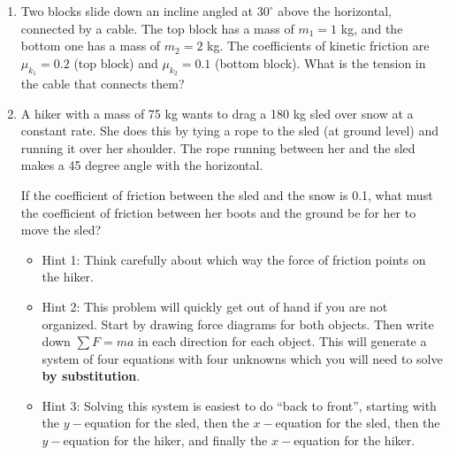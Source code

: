 \documentclass[12pt]{article}
\begin{document}
\begin{enumerate}
\bigskip

\item{Two blocks slide down an incline angled at $30^\circ$ above the horizontal, connected by a cable. The top block has a mass of $m_1=1$ kg, and the bottom one has a mass of $m_2=2$ kg. The coefficients of kinetic friction are 
  $\mu_{k_1}=0.2$ (top block) and $\mu_{k_2}=0.1$ (bottom block). What is the tension in the cable that connects them?}


\bigskip

\item{A hiker with a mass of 75 kg wants to drag a 180 kg sled over snow at a constant rate. She does this by tying a rope to the sled (at ground level) and running it over her shoulder. The rope running between her and the sled makes a 45 degree angle with the horizontal.

  If the coefficient of friction between the sled and the snow is 0.1, what must the coefficient of friction between her boots and the ground be for her to move the sled?}

\begin{itemize}
\item {\sc Hint 1:} Think carefully about which way the force of friction points on the hiker. 
\item {\sc Hint 2:} This problem will quickly get out of hand if you are not organized. Start by drawing force diagrams for both objects. Then write down $\sum F = ma$ in each direction for each object. This will generate a system of four equations with four unknowns which you will need to solve {\bf by substitution}.
\item {\sc Hint 3:} Solving this system is easiest to do ``back to front'', starting with the $y-$equation for the sled, then the $x-$equation for the sled, then the $y-$equation for the hiker, and finally the $x-$equation for the hiker.
\end{itemize}


%


\end{enumerate}
\end{document}
